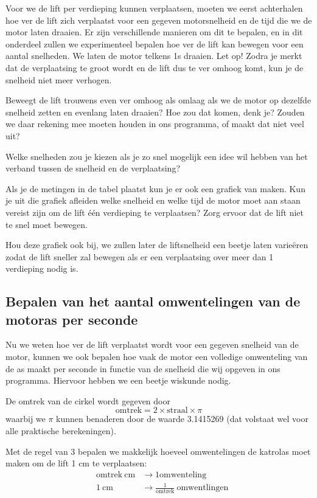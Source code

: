 \documentclass[a4paper, 10pt]{article}
\begin{document}
Voor we de lift per verdieping kunnen verplaatsen, moeten we eerst achterhalen hoe ver de lift zich verplaatst voor
een gegeven motorsnelheid en de tijd die we de motor laten draaien. Er zijn verschillende manieren om dit te bepalen,
en in dit onderdeel zullen we experimenteel bepalen hoe ver de lift kan bewegen voor een aantal snelheden. We laten
de motor telkens 1s draaien. Let op! Zodra je merkt dat de verplaatsing te groot wordt en de lift dus te ver omhoog
komt, kun je de snelheid niet meer verhogen.

Beweegt de lift trouwens even ver omhoog als omlaag als we de motor op
dezelfde snelheid zetten en evenlang laten draaien? Hoe zou dat komen, denk je? Zouden we daar rekening mee moeten houden
in ons programma, of maakt dat niet veel uit?


Welke snelheden zou je kiezen als je zo snel mogelijk een idee wil hebben van het verband tussen de snelheid
en de verplaatsing?

Als je de metingen in de tabel plaatst kun je er ook een grafiek van maken. Kun je uit die grafiek afleiden welke
snelheid en welke tijd de motor moet aan staan  vereist zijn om de lift \'e\'en verdieping te verplaatsen?
Zorg ervoor dat de lift niet te snel moet bewegen.

Hou deze grafiek ook bij, we zullen later de liftsnelheid een beetje laten varie\"eren zodat de lift sneller zal
bewegen als er een verplaatsing over meer dan 1 verdieping nodig is.

\subsection{Bepalen van het aantal omwentelingen van de motoras per seconde}

Nu we weten hoe ver de lift verplaatst wordt voor een gegeven snelheid van de motor, kunnen we ook bepalen
hoe vaak de motor een volledige omwenteling van de as maakt per seconde in functie van de snelheid die wij
opgeven in ons programma. Hiervoor hebben we een beetje wiskunde nodig.

De omtrek van de cirkel wordt gegeven door
\begin{equation}
\mathrm{omtrek} = 2 \times \mathrm{straal} \times \pi
\end{equation}
waarbij we $\pi$ kunnen benaderen door de waarde 3.1415269 (dat volstaat wel voor alle praktische berekeningen).

Met de regel van 3 bepalen we makkelijk hoeveel omwentelingen de katrolas moet maken om de lift 1 cm te verplaatsen:
\begin{align}
& \mathrm{omtrek}\ \mathrm{cm} & \rightarrow 1 \mathrm{omwenteling}\\
& 1\ \mathrm{cm}               & \rightarrow \frac{1}{\mathrm{omtrek}}\ \mathrm{omwentlingen}
\end{align}
\end{document}
